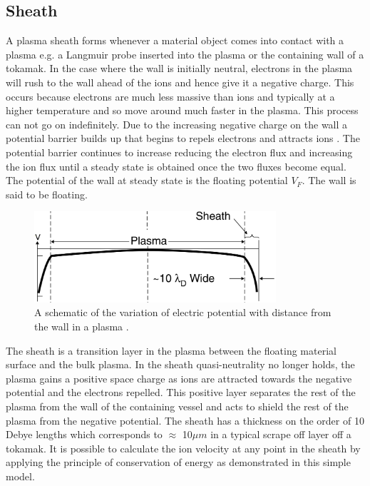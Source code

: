 \documentclass[12pt]{article}
\begin{document}
\subsection{Sheath}

A plasma sheath forms whenever a material object comes into contact with a plasma e.g. a Langmuir probe inserted into the plasma or the containing wall of a tokamak. In the case where the wall is initially neutral, electrons in the plasma will rush to the wall ahead of the ions and hence give it a negative charge. This occurs because electrons are much less massive than ions and typically at a higher temperature and so move around much faster in the plasma. This process can not go on indefinitely. Due to the increasing negative charge on the wall a potential barrier builds up that begins to repels electrons and attracts ions \cite{sheathformation}. The potential barrier continues to increase reducing the electron flux and increasing the ion flux until a steady state is obtained once the two fluxes become equal. The potential of the wall at steady state is the floating potential $V_F$. The wall is said to be floating. 
\begin{figure}[H]
\centering
\includegraphics[width=0.8\textwidth]{stangebysheath}
\caption{A schematic of the variation of electric potential with distance from the wall in a plasma \cite{stangeby-2000}.}
\label{fig:stangebysheath}
\end{figure}
The sheath is a transition layer in the plasma between the floating material surface and the bulk plasma. In the sheath quasi-neutrality no longer holds, the plasma gains a positive space charge as ions are attracted towards the negative potential and the electrons repelled. This positive layer separates the rest of the plasma from the wall of the containing vessel and acts to shield the rest of the plasma from the negative potential. The sheath has a thickness on the order of 10 Debye lengths which corresponds to $\approx $ 10$ \mu m$ in a typical scrape off layer off a tokamak. %
 It is possible to calculate the ion velocity at any point in the sheath by applying the principle of conservation of energy as demonstrated in this simple model.
\end{document}
